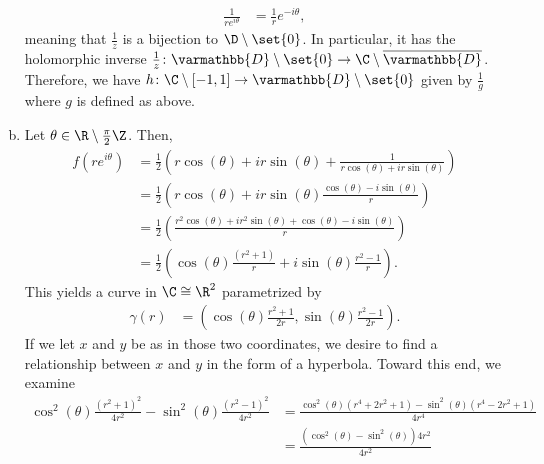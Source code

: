 \documentclass[10pt]{mypackage}
\renewcommand*{\mathbb}[1]{\varmathbb{#1}}
\begin{document}
\begin{solution}
\begin{enumerate}[(a)]
      \begin{align*}
        \frac{1}{re^{i\theta}} &= \frac{1}{r}e^{-i\theta},
      \end{align*}
      meaning that $ \frac{1}{z} $ is a bijection to $\D\setminus \set{0}$. In particular, it has the holomorphic inverse $\frac{1}{z}\colon \mathbb{D}\setminus \set{0}\rightarrow \C\setminus \overline{ \mathbb{D} }$. Therefore, we have $h\colon \C\setminus [-1,1]\rightarrow  \mathbb{D}\setminus \set{0}$ given by $\frac{1}{g}$ where $g$ is defined as above.
    \item Let $\theta\in \R\setminus \frac{\pi}{2}\Z$. Then,
      \begin{align*}
        f\left( re^{i\theta} \right) &= \frac{1}{2} \left( r\cos\left( \theta \right) + ir\sin\left( \theta \right) + \frac{1}{r\cos\left( \theta \right) + ir\sin\left( \theta \right)} \right)\\
                                     &= \frac{1}{2} \left( r\cos\left( \theta \right) + ir\sin\left( \theta \right) \frac{\cos\left( \theta \right) - i\sin\left( \theta \right)}{r} \right)\\
                                     &= \frac{1}{2}\left( \frac{r^2\cos\left( \theta \right) + ir^2\sin\left( \theta \right) + \cos\left( \theta \right) - i\sin\left( \theta \right)}{r} \right)\\
                                     &= \frac{1}{2} \left( \cos\left( \theta \right)\frac{\left( r^2 + 1 \right)}{r} + i\sin\left( \theta \right)\frac{r^2 -1}{r} \right).
      \end{align*}
      This yields a curve in $\C \cong \R^{2}$ parametrized by
      \begin{align*}
        \gamma\left( r \right)  &= \left( \cos\left( \theta \right)\frac{r^2 + 1}{2r} , \sin\left( \theta \right)\frac{r^2 - 1}{2r} \right).
      \end{align*}
      If we let $x$ and $y$ be as in those two coordinates, we desire to find a relationship between $x$ and $y$ in the form of a hyperbola. Toward this end, we examine
      \begin{align*}
        \cos^2\left( \theta \right)\frac{\left( r^2 + 1 \right)^2}{4r^2} - \sin^2\left( \theta \right)\frac{\left( r^2 - 1 \right)^2}{4r^2} &= \frac{\cos^2\left( \theta \right)\left( r^4 + 2r^2 + 1 \right) - \sin^2\left( \theta \right)\left( r^4 - 2r^2 + 1 \right)}{4r^{4}}\\
                                                                                                                                            &= \frac{\left( \cos^2\left( \theta \right) - \sin^2\left( \theta \right) \right) 4r^2}{4r^2}\\

\end{align*}
\end{enumerate}
\end{solution}
\end{document}
